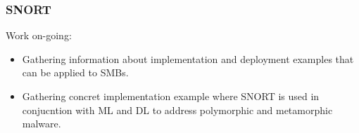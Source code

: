 \subsubsection{SNORT}

\begin{notes}

    Work on-going:

    \begin{itemize}
        \item Gathering information about implementation and deployment examples that can be applied to SMBs.
        \item Gathering concret implementation example where SNORT is used in conjucntion with ML and DL to address polymorphic and metamorphic malware.\\
    \end{itemize}
    
\end{notes}
